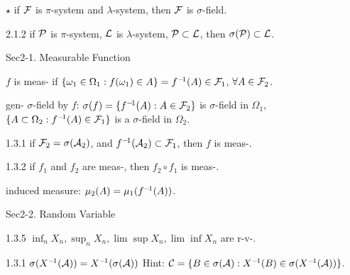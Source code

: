 \begin{ex}{$\star$}
    if $\mathcal{F}$ is $\pi$-system and $\lambda$-system, then $\mathcal{F}$ is $\sigma$-field.
\end{ex}

\begin{thm}{2.1.2}
    if $\mathcal{P}$ is $\pi$-system, $\mathcal{L}$ is $\lambda$-system, $\mathcal{P} \subset \mathcal{L}$, then $\sigma(\mathcal{P}) \subset \mathcal{L}$.
\end{thm}

Sec2-1. Measurable Function \hrulefill

\begin{defi}
    $f$ is meas- if $\{\omega_1\in\Omega_1: f(\omega_1)\in A\} = {f}^{-\!1}(A) \in \mathcal{F}_1$, $\forall A\in \mathcal{F}_2$.
\end{defi}

\begin{fact}
    gen- $\sigma$-field by $f$: $\sigma(f) = \{{f}^{-\!1}(A): A\in \mathcal{F}_2\}$ is $\sigma$-field in $\Omega_1$,
    $\{A \subset \Omega_2: {f}^{-\!1}(A) \in \mathcal{F}_1\}$ is a $\sigma$-field in $\Omega_2$.
\end{fact}

\begin{thm}{1.3.1}
    if $\mathcal{F}_2 = \sigma(\mathcal{A}_2)$, and ${f}^{-\!1}(\mathcal{A}_2) \subset \mathcal{F}_1$, then $f$ is meas-.
\end{thm}

\begin{thm}{1.3.2}
    if $f_1$ and $f_2$ are meas-, then $f_2 \circ f_1$ is meas-.
\end{thm}

\begin{defi}
    induced measure: $\mu_2(A) = \mu_1({f}^{-\!1}(A))$.
\end{defi}

Sec2-2. Random Variable \hrulefill


    

\begin{thm}{1.3.5}
    $\inf_n X_n, \sup_n X_n, \lim\sup X_n, \lim\inf X_n$ are r-v-.
\end{thm}

\begin{ex}{1.3.1}
    $ \sigma({X}^{-\!1}(\mathcal{A})) = {X}^{-\!1}(\sigma(\mathcal{A}))$    
    \newline 
    Hint: $\mathcal{C} = \{B \in \sigma(\mathcal{A}): {X}^{-\!1}(B) \in \sigma({X}^{-\!1}(\mathcal{A})) \}$.
\end{ex}


